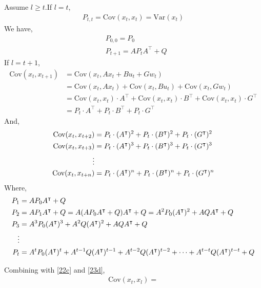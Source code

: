\documentclass[a4paper,11pt,reqno]{amsart}
\newcommand{\tran}{\intercal}
\begin{document}
Assume $l\geq t$.If $l=t$, 
$$
\begin{aligned}
    P_{t,t}=\text{Cov}(x_t,x_t)=\text{Var}(x_t) 
\end{aligned}
$$
We have,
\begin{subequations}
    \begin{align}
    &P_{0,0}=P_0 
    \\
    &P_{t+1}=AP_tA^{\tran}+Q
\end{align}
\end{subequations}
If $l=t+1$,
$$
\begin{aligned}
    \text{Cov}(x_t,x_{t+1})&=\text{Cov}(x_t,Ax_t+Bu_t+Gw_t)
    \\
    &=\text{Cov}(x_t,Ax_t)+\text{Cov}(x_t,Bu_t)+\text{Cov}(x_t,Gw_t)
    \\
    &=\text{Cov}(x_t,x_t)\cdot A^{\tran}+\text{Cov}(x_t,x_t)\cdot B^{\tran}+\text{Cov}(x_t,x_t)\cdot G^{\tran}
    \\
    &=P_t\cdot A^{\tran}+P_t\cdot B^{\tran}+P_t\cdot G^{\tran}
\end{aligned}
$$
And,
\begin{subequations}
    \begin{align}
    \text{Cov}(x_t,x_{t+2})&=P_t\cdot (A^{\tran})^2+P_t\cdot (B^{\tran})^2+P_t\cdot (G^{\tran})^2
    \\
    \text{Cov}(x_t,x_{t+3})&=P_t\cdot (A^{\tran})^3+P_t\cdot (B^{\tran})^3+P_t\cdot (G^{\tran})^3
    \\
    \vdots \notag
    \\
    \text{Cov}(x_t,x_{t+n})&=P_t\cdot (A^{\tran})^n+P_t\cdot (B^{\tran})^n+P_t\cdot (G^{\tran})^n
    \label{22c}
\end{align}
\end{subequations}
Where,
\begin{subequations}
    \begin{align}
    P_1&=AP_0A^{\tran}+Q
    \\
    P_2&=AP_1A^{\tran}+Q=A(AP_0A^{\tran}+Q)A^{\tran}+Q=A^2P_0(A^{\tran})^2+AQA^{\tran}+Q
    \\
    P_3&=A^3P_0(A^{\tran})^3+A^2Q(A^{\tran})^2+AQA^{\tran}+Q
    \\
    \vdots \notag
    \\
    P_t&=A^tP_0(A^{\tran})^t+A^{t-1}Q(A^{\tran})^{t-1}+A^{t-2}Q(A^{\tran})^{t-2}+\cdots+A^{t-t}Q(A^{\tran})^{t-t}+Q
    \label{23d}
\end{align}
\end{subequations}

Combining with \ref{22c} and \ref{23d},
$$
\begin{aligned}
    \text{Cov}(x_t,x_l)=
\end{aligned}
$$
\end{document}
